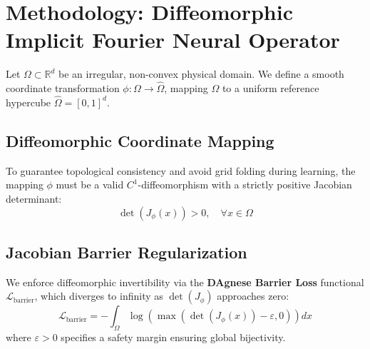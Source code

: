 \section{Methodology: Diffeomorphic Implicit Fourier Neural Operator}
\label{sec:theory}

Let $\Omega \subset \mathbb{R}^d$ be an irregular, non-convex physical domain. We define a smooth coordinate transformation $\phi: \Omega \to \hat{\Omega}$, mapping $\Omega$ to a uniform reference hypercube $\hat{\Omega} = [0,1]^d$.

\subsection{Diffeomorphic Coordinate Mapping}
To guarantee topological consistency and avoid grid folding during learning, the mapping $\phi$ must be a valid $C^1$-diffeomorphism with a strictly positive Jacobian determinant:
\begin{equation}
\det(J_\phi(x)) > 0, \quad \forall x \in \Omega
\end{equation}

\subsection{Jacobian Barrier Regularization}
We enforce diffeomorphic invertibility via the \textbf{DAgnese Barrier Loss} functional $\mathcal{L}_{\text{barrier}}$, which diverges to infinity as $\det(J_\phi)$ approaches zero:
\begin{equation}
\mathcal{L}_{\text{barrier}} = -\int_{\Omega} \log \left( \max( \det(J_\phi(x)) - \varepsilon, 0 ) \right) dx
\end{equation}
where $\varepsilon > 0$ specifies a safety margin ensuring global bijectivity.
